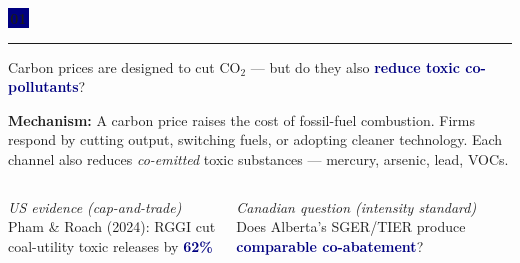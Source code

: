 \documentclass[aspectratio=169,12pt]{beamer}
\newcommand{\badge}[2][Navy]{%
  \colorbox{#1}{\color{white}\,\textbf{\small #2}\,}%
}
\newcommand{\hi}[1]{\textcolor{Navy}{\textbf{#1}}}
\begin{document}
\begin{frame}
\badge{01}
\vspace{0.5em}\par
{\color{Blue}\rule{\linewidth}{0.8pt}}\par
\vspace{0.6em}

Carbon prices are designed to cut CO$_2$ — but do they also \hi{reduce
toxic co-pollutants}?

\vspace{0.8em}

\begin{tcolorbox}[resultbox]
\textbf{Mechanism:} A carbon price raises the cost of fossil-fuel combustion.
Firms respond by cutting output, switching fuels, or adopting cleaner technology.
Each channel also reduces \emph{co-emitted} toxic substances — mercury,
arsenic, lead, VOCs.
\end{tcolorbox}

\vspace{0.8em}

\begin{columns}[T]
\textcolor{MidGray}{\small\textit{US evidence (cap-and-trade)}}\\[3pt]
Pham \& Roach (2024): RGGI cut\\
coal-utility toxic releases by \hi{62\%}

\textcolor{MidGray}{\small\textit{Canadian question (intensity standard)}}\\[3pt]
Does Alberta's SGER/TIER produce\\
\hi{comparable co-abatement}?
\end{columns}
\end{frame}
\end{document}
